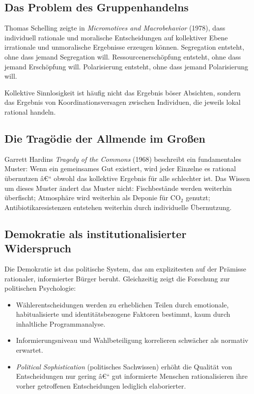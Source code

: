 ﻿\documentclass[12pt, a4paper]{article}
\begin{document}
\subsection{Das Problem des Gruppenhandelns}

Thomas Schelling zeigte in \textit{Micromotives and Macrobehavior} (1978),
dass individuell rationale und moralische Entscheidungen auf kollektiver
Ebene irrationale und unmoralische Ergebnisse erzeugen können. Segregation
entsteht, ohne dass jemand Segregation will. Ressourcenerschöpfung entsteht,
ohne dass jemand Erschöpfung will. Polarisierung entsteht, ohne dass jemand
Polarisierung will.

Kollektive Sinnlosigkeit ist häufig nicht das Ergebnis böser Absichten,
sondern das Ergebnis von Koordinationsversagen zwischen Individuen, die
jeweils lokal rational handeln.

\subsection{Die Tragödie der Allmende im Großen}

Garrett Hardins \emph{Tragedy of the Commons} (1968) beschreibt ein
fundamentales Muster: Wenn ein gemeinsames Gut existiert, wird jeder
Einzelne es rational übernutzen â€“ obwohl das kollektive Ergebnis für alle
schlechter ist. Das Wissen um dieses Muster ändert das Muster nicht:
Fischbestände werden weiterhin überfischt; Atmosphäre wird weiterhin als
Deponie für CO$_2$ genutzt; Antibiotikaresistenzen entstehen weiterhin durch
individuelle Übernutzung.

\subsection{Demokratie als institutionalisierter Widerspruch}

Die Demokratie ist das politische System, das am explizitesten auf der
Prämisse rationaler, informierter Bürger beruht. Gleichzeitig zeigt die
Forschung zur politischen Psychologie:

\begin{itemize}
  \item Wählerentscheidungen werden zu erheblichen Teilen durch emotionale,
    habitualisierte und identitätsbezogene Faktoren bestimmt, kaum durch
    inhaltliche Programmanalyse.
  \item Informierungsniveau und Wahlbeteiligung korrelieren schwächer als
    normativ erwartet.
  \item \emph{Political Sophistication} (politisches Sachwissen) erhöht die
    Qualität von Entscheidungen nur gering â€“ gut informierte Menschen
    rationalisieren ihre vorher getroffenen Entscheidungen lediglich
    elaborierter.
\end{itemize}
\end{document}
